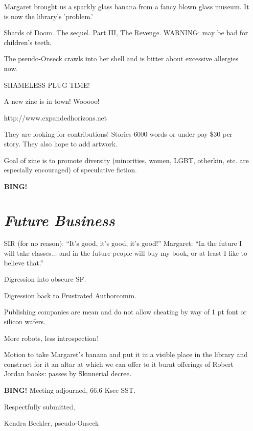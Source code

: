 \documentclass[10pt]{article}
\newcommand{\bing}{{\bf BING!} }
\newcommand{\goto}[1]{\bing \vskip 12pt \section*{{\em{#1}}}}
\begin{document}
Margaret brought us a sparkly glass banana from a fancy blown glass museum.  It is now the library's 'problem.'

Shards of Doom.  The sequel.  Part III, The Revenge.  WARNING: may be bad for children's teeth.

The pseudo-Onseck crawls into her shell and is bitter about excessive allergies now.

SHAMELESS PLUG TIME!

A new zine is in town!  Wooooo!

http://www.expandedhorizons.net

They are looking for contributions!  Stories 6000 words or under pay \$30 per story.  They also hope to add artwork.

Goal of zine is to promote diversity (minorities, women, LGBT, otherkin, etc. are especially encouraged) of speculative fiction.

\goto{Future Business}

SIR (for no reason): ``It's good, it's good, it's good!''
Margaret: ``In the future I will take classes... and in the future people will buy my book, or at least I like to believe that.''

Digression into obscure SF.

Digression back to Frustrated Authorcomm.

Publishing companies are mean and do not allow cheating by way of 1 pt font or silicon wafers.

More robots, less introspection!

Motion to take Margaret's banana and put it in a visible place in the library and construct for it an altar at which we can offer to it burnt offerings of Robert Jordan books: passes by Skinnerial decree.

\bing
\noindent
Meeting adjourned, 66.6 Ksec SST.

\vspace{18pt}

\centerline{Respectfully submitted,}
\centerline{Kendra Beckler, pseudo-Onseck}
\end{document}

